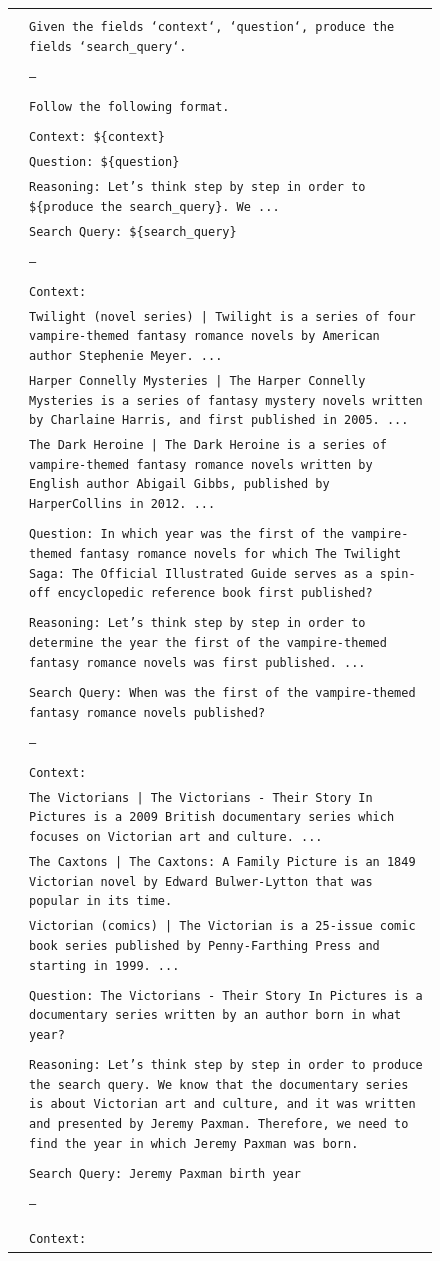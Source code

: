 { %

\newcommand{\pWidth}{5in}
\newcommand{\pStart}{\setcounter{pCount}{1}}
\newcommand{\pRow}[1]{\texttt{\fontsize{6pt}{1pt}\selectfont\color{gray}\arabic{pCount}}&\texttt{\fontsize{6pt}{1pt}\selectfont#1}\stepcounter{pCount}\\}
\newcommand{\pVar}[1]{\textbf{\{#1\}}}
\newcommand{\pBlank}{\_\_\_\_\_}
\begin{figure}[p]
\begin{center}\scriptsize
\begin{tabular}{|rp{\pWidth}|}\hline\pStart&\\
\pRow{Given the fields `context`, `question`, produce the fields `search\_query`.}
\pRow{}
\pRow{---}
\pRow{}
\pRow{Follow the following format.}
\pRow{}
\pRow{Context: \$\{context\}}
\pRow{Question: \$\{question\}}
\pRow{Reasoning: Let's think step by step in order to \$\{produce the search\_query\}. We ...}
\pRow{Search Query: \$\{search\_query\}}
\pRow{}
\pRow{---}
\pRow{}
\pRow{Context:}
\pRow{[1] Twilight (novel series) | Twilight is a series of four vampire-themed fantasy romance novels by American author Stephenie Meyer. ...}
\pRow{[2] Harper Connelly Mysteries | The Harper Connelly Mysteries is a series of fantasy mystery novels written by Charlaine Harris, and first published in 2005. ...}
\pRow{[3] The Dark Heroine | The Dark Heroine is a series of vampire-themed fantasy romance novels written by English author Abigail Gibbs, published by HarperCollins in 2012. ...}
\pRow{}
\pRow{Question: In which year was the first of the vampire-themed fantasy romance novels for which The Twilight Saga: The Official Illustrated Guide serves as a spin-off encyclopedic reference book first published?}
\pRow{}
\pRow{Reasoning: Let's think step by step in order to determine the year the first of the vampire-themed fantasy romance novels was first published. ...}
\pRow{}
\pRow{Search Query: When was the first of the vampire-themed fantasy romance novels published?}
\pRow{}
\pRow{---}
\pRow{}
\pRow{Context:}
\pRow{[1] The Victorians | The Victorians - Their Story In Pictures is a 2009 British documentary series which focuses on Victorian art and culture. ...}
\pRow{[2] The Caxtons | The Caxtons: A Family Picture is an 1849 Victorian novel by Edward Bulwer-Lytton that was popular in its time.}
\pRow{[3] Victorian (comics) | The Victorian is a 25-issue comic book series published by Penny-Farthing Press and starting in 1999. ...}
\pRow{}
\pRow{Question: The Victorians - Their Story In Pictures is a documentary series written by an author born in what year?}
\pRow{}
\pRow{Reasoning: Let's think step by step in order to produce the search query. We know that the documentary series is about Victorian art and culture, and it was written and presented by Jeremy Paxman. Therefore, we need to find the year in which Jeremy Paxman was born.}
\pRow{}
\pRow{Search Query: Jeremy Paxman birth year}
\pRow{}
\pRow{---}
\pRow{}
\pRow{}
\pRow{Context:}


\end{tabular}
\end{center}
\end{figure}}
